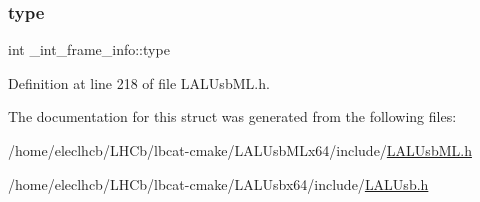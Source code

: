 \subsubsection{\texorpdfstring{type}{type}}
{\footnotesize\ttfamily int \+\_\+int\+\_\+frame\+\_\+info\+::type}



Definition at line 218 of file L\+A\+L\+Usb\+M\+L.\+h.



The documentation for this struct was generated from the following files\+:\begin{DoxyCompactItemize}
\item 
/home/eleclhcb/\+L\+H\+Cb/lbcat-\/cmake/\+L\+A\+L\+Usb\+M\+Lx64/include/\hyperlink{LALUsbML_8h}{L\+A\+L\+Usb\+M\+L.\+h}\item 
/home/eleclhcb/\+L\+H\+Cb/lbcat-\/cmake/\+L\+A\+L\+Usbx64/include/\hyperlink{LALUsb_8h}{L\+A\+L\+Usb.\+h}\end{DoxyCompactItemize}
